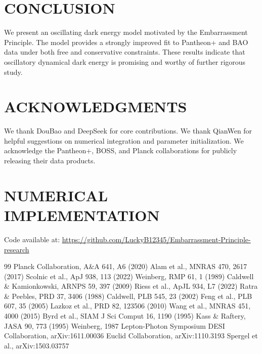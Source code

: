 \documentclass[10pt,twocolumn]{article}
\begin{document}
\section{CONCLUSION}
We present an oscillating dark energy model motivated by the Embarrassment Principle.
The model provides a strongly improved fit to Pantheon+ and BAO data under both free and conservative constraints.
These results indicate that oscillatory dynamical dark energy is promising and worthy of further rigorous study.

\section*{ACKNOWLEDGMENTS}
We thank DouBao and DeepSeek for core contributions. We thank QianWen for helpful suggestions on numerical integration and parameter initialization. We acknowledge the Pantheon+, BOSS, and Planck collaborations for publicly releasing their data products.

\appendix
\section{NUMERICAL IMPLEMENTATION}
Code available at: \url{https://github.com/LuckyB12345/Embarrassment-Principle-research}

\begin{thebibliography}{99}
 Planck Collaboration, A\&A 641, A6 (2020)
 Alam et al., MNRAS 470, 2617 (2017)
 Scolnic et al., ApJ 938, 113 (2022)
 Weinberg, RMP 61, 1 (1989)
 Caldwell \& Kamionkowski, ARNPS 59, 397 (2009)
 Riess et al., ApJL 934, L7 (2022)
 Ratra \& Peebles, PRD 37, 3406 (1988)
 Caldwell, PLB 545, 23 (2002)
 Feng et al., PLB 607, 35 (2005)
 Lazkoz et al., PRD 82, 123506 (2010)
 Wang et al., MNRAS 451, 4000 (2015)
 Byrd et al., SIAM J Sci Comput 16, 1190 (1995)
 Kass \& Raftery, JASA 90, 773 (1995)
 Weinberg, 1987 Lepton-Photon Symposium
 DESI Collaboration, arXiv:1611.00036
 Euclid Collaboration, arXiv:1110.3193
 Spergel et al., arXiv:1503.03757
\end{thebibliography}
\end{document}
